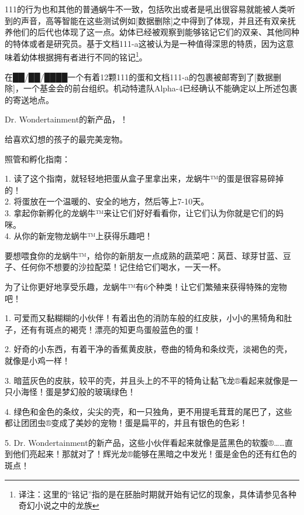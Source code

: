 111的行为也和其他的普通蜗牛不一致，包括吹出或者是吼出很容易就能被人类听到的声音，高等智能在这些测试例如{[}数据删除]之中得到了体现，并且还有双亲抚养他们的后代也体现了这一点。幼体已经被观察到能够铭记它们的双亲、其他同种的特体或者是研究员。基于文档111-a这被认为是一种值得深思的特质，因为这意味着幼体根据拥有者进行不同的铭记\footnote{译注：这里的“铭记”指的是在胚胎时期就开始有记忆的现象，具体请参见各种奇幻小说之中的龙族}。

在██\slash ██\slash ████一个有着12颗111的蛋和文档111-a的包裹被邮寄到了{[}数据删除]，一个基金会的前台组织。机动特遣队Alpha-4已经确认不能确定以上所述包裹的寄送地点。


\begin{scpbox}

Dr. Wondertainment的新产品，！

给喜欢幻想的孩子的最完美宠物。

照管和孵化指南：

1. 读了这个指南，就轻轻地把蛋从盒子里拿出来，龙蜗牛™的蛋是很容易碎掉的！\\
2. 将蛋放在一个温暖的、安全的地方，然后等上7-10天。\\
3. 拿起你新孵化的龙蜗牛™来让它们好好看看你，让它们认为你就是它们的妈咪。\\
4. 从你的新宠物龙蜗牛™上获得乐趣吧！

要想喂食你的龙蜗牛™，给你的新朋友一点成熟的蔬菜吧：莴苣、球芽甘蓝、豆子、任何你不想要的沙拉配菜！记住给它们喝水，一天一杯。

为了让你更好地享受乐趣，龙蜗牛™有6个种类！让它们繁殖来获得特殊的宠物吧！


1. 可爱而又黏糊糊的小伙伴！有着出色的消防车般的红皮肤，小小的黑犄角和肚子，还有有斑点的褐壳！漂亮的知更鸟蛋般蓝色的蛋！

2. 好奇的小东西，有着干净的香蕉黄皮肤，卷曲的犄角和条纹壳，淡褐色的壳，就像是小鸡一样！

3. 暗蓝灰色的皮肤，较平的壳，并且头上的不平的犄角让黏飞龙®看起来就像是一只小海怪！蛋是梦幻般的玻璃绿色！

4. 绿色和金色的条纹，尖尖的壳，和一只独角，更不用提毛茸茸的尾巴了，这些都让团团虫®变成了美妙的宠物！蛋是扁平的，并且有银色的色彩！

5. Dr. Wondertainment的新产品，这些小伙伴看起来就像是蓝黑色的软腹®……直到他们亮起来！那就对了！辉光龙®能够在黑暗之中发光！蛋是金色的还有红色的斑点！


\end{scpbox}
